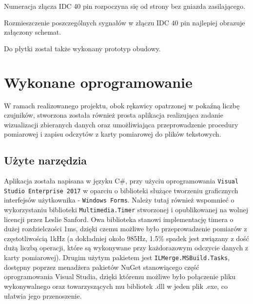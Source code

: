 \documentclass[10pt, a4paper]{article}
\begin{document}
Numeracja złącza IDC 40 pin rozpoczyna się od strony bez gniazda zasilającego.

Rozmieszczenie poszczególnych sygnałów w złączu IDC 40 pin najlepiej obrazuje załączony schemat.

Do płytki został także wykonany prototyp obudowy.

\section{Wykonane oprogramowanie}
\label{sec:program}

W ramach realizowanego projektu, obok rękawicy opatrzonej w pokaźną liczbę czujników, stworzona została również prosta aplikacja realizująca zadanie wizualizacji zbieranych danych oraz umożliwiająca przeprowadzenie procedury pomiarowej i zapisu odczytów z karty pomiarowej do plików tekstowych.
\subsection{Użyte narzędzia}
Aplikacja została napisana w języku C\#, przy użyciu oprogramowania \texttt{Visual Studio Enterprise 2017} w oparciu o biblioteki służące tworzeniu graficznych interfejsów użytkownika - \texttt{Windows Forms}. Należy tutaj również wspomnieć o wykorzystaniu biblioteki \texttt{Multimedia.Timer} stworzonej i opublikowanej na wolnej licencji przez Leslie Sanford. Owa biblioteka stanowi implementację timera o dużej rozdzielczości 1ms, dzięki czemu możliwe było przeprowadzenie pomiarów z częstotliwością 1kHz (a dokładniej około 985Hz, 1.5\% spadek jest związany z dość dużą liczbą operacji, które są wykonywane przy każdorazowym odczycie danych z karty pomiarowej). Drugim użytym pakietem jest \texttt{ILMerge.MSBuild.Tasks}, dostępny poprzez menadżera pakietów NuGet stanowiącego część oprogramowania Visual Studia, dzięki któremu możliwe było połączenie pliku wykonywalnego oraz towarzyszących mu bibliotek .dll w jeden plik .exe, co ułatwia jego przenoszenie.
\end{document}
